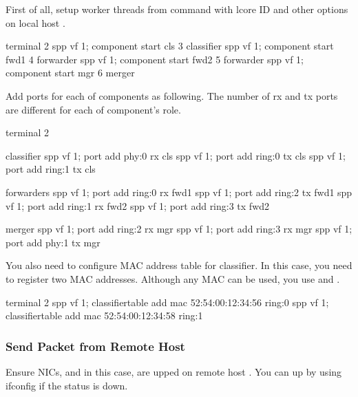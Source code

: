 \documentclass[a4paper,11pt,openany,oneside,english]{sphinxmanual}
\begin{document}
First of all, setup worker threads from  command with lcore ID
and other options on local host .

\begin{sphinxVerbatim}[commandchars=\\\{\},formatcom=\footnotesize]
\PYGZsh{} terminal 2
spp \PYGZgt{} vf 1; component start cls 3 classifier
spp \PYGZgt{} vf 1; component start fwd1 4 forwarder
spp \PYGZgt{} vf 1; component start fwd2 5 forwarder
spp \PYGZgt{} vf 1; component start mgr 6 merger
\end{sphinxVerbatim}

Add ports for each of components as following.
The number of rx and tx ports are different for each of component’s role.

\begin{sphinxVerbatim}[commandchars=\\\{\},formatcom=\footnotesize]
\PYGZsh{} terminal 2

\PYGZsh{} classifier
spp \PYGZgt{} vf 1; port add phy:0 rx cls
spp \PYGZgt{} vf 1; port add ring:0 tx cls
spp \PYGZgt{} vf 1; port add ring:1 tx cls

\PYGZsh{} forwarders
spp \PYGZgt{} vf 1; port add ring:0 rx fwd1
spp \PYGZgt{} vf 1; port add ring:2 tx fwd1
spp \PYGZgt{} vf 1; port add ring:1 rx fwd2
spp \PYGZgt{} vf 1; port add ring:3 tx fwd2

\PYGZsh{} merger
spp \PYGZgt{} vf 1; port add ring:2 rx mgr
spp \PYGZgt{} vf 1; port add ring:3 rx mgr
spp \PYGZgt{} vf 1; port add phy:1 tx mgr
\end{sphinxVerbatim}

You also need to configure MAC address table for classifier. In this case,
you need to register two MAC addresses. Although any MAC can be used,
you use  and .

\begin{sphinxVerbatim}[commandchars=\\\{\},formatcom=\footnotesize]
\PYGZsh{} terminal 2
spp \PYGZgt{} vf 1; classifier\PYGZus{}table add mac 52:54:00:12:34:56 ring:0
spp \PYGZgt{} vf 1; classifier\PYGZus{}table add mac 52:54:00:12:34:58 ring:1
\end{sphinxVerbatim}


\subsubsection{Send Packet from Remote Host}
\label{\detokenize{usecases/spp_vf:send-packet-from-remote-host}}
Ensure NICs,  and  in this case, are upped on remote host
. You can up by using ifconfig if the status is down.
\end{document}
